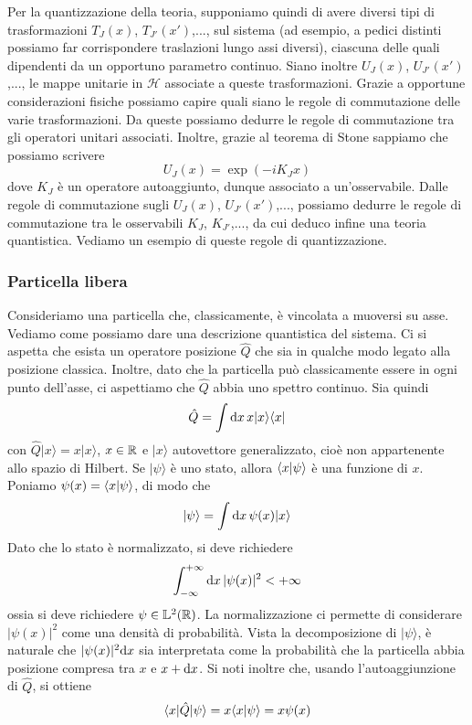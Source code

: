 \documentclass[a4paper, 11pt]{article}
\renewcommand{\H}{\mathcal{H}}
\renewcommand{\L}{\mathbb{L}}
\newcommand{\pos}{\hat{Q}}
\renewcommand{\ket}[1]{| #1\rangle}
\renewcommand{\bra}[1]{\langle #1|}
\begin{document}
Per la quantizzazione della teoria, supponiamo quindi di avere diversi tipi di trasformazioni $T_{J}(x)$, $T_{J'}(x')$,..., sul sistema (ad esempio, a pedici distinti possiamo far corrispondere traslazioni lungo assi diversi), ciascuna delle quali dipendenti da un opportuno parametro continuo. Siano inoltre $U_J(x)$, $U_{J'}(x')$,..., le mappe unitarie in $\H$ associate a queste trasformazioni. Grazie a opportune considerazioni fisiche possiamo capire quali siano le regole di commutazione delle varie trasformazioni. Da queste possiamo dedurre le regole di commutazione tra gli operatori unitari associati. Inoltre, grazie al teorema di Stone sappiamo che possiamo scrivere
\[U_J(x)=\exp(-iK_Jx)\]
dove $K_J$ è un operatore autoaggiunto, dunque associato a un'osservabile. Dalle regole di commutazione sugli $U_J(x)$, $U_{J'}(x')$,..., possiamo dedurre le regole di commutazione tra le osservabili $K_J$, $K_{J'}$,..., da cui deduco infine una teoria quantistica. Vediamo un esempio di queste regole di quantizzazione.
\subsubsection{Particella libera}
Consideriamo una particella che, classicamente, è vincolata a muoversi su asse. Vediamo come possiamo dare una descrizione quantistica del sistema. Ci si aspetta che esista un operatore posizione $\pos$ che sia in qualche modo legato alla posizione classica. Inoltre, dato che la particella può classicamente essere in ogni punto dell'asse, ci aspettiamo che $\pos$ abbia uno spettro continuo. Sia quindi
\[\pos=\int\d x\,x\ket x\bra x\]
con $\pos\ket x=x\ket x$, $x\in\mathbb{R}$ e $\ket x$ autovettore generalizzato, cioè non appartenente allo spazio di Hilbert. Se $\ket\psi$ è uno stato, allora $\langle x\vert\psi\rangle$ è una funzione di $x$. Poniamo $\psi(x)=\langle x\vert\psi\rangle$, di modo che
\[\ket\psi=\int \d x\,\psi(x)\ket{x}\]
Dato che lo stato è normalizzato, si deve richiedere
\[\int_{-\infty}^{+\infty}\mathrm{d} x\,|\psi(x)|^2<+\infty\]
ossia si deve  richiedere $\psi\in\L^2(\R)$. La normalizzazione ci permette di considerare $|\psi(x)|^2$ come una densità di probabilità. Vista la decomposizione di $\ket\psi$, è naturale che $|\psi(x)|^2\mathrm{d} x$ sia interpretata come la probabilità che la particella abbia posizione compresa tra $x$ e $x+\mathrm{d} x$. Si noti inoltre che, usando l'autoaggiunzione di $\pos$, si ottiene
\[\braketop{x}{\pos}{\psi}=x\braket{x}{\psi}=x\psi(x)\]
\end{document}

